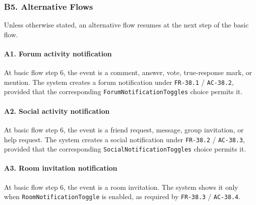 \documentclass[12pt]{article}
\begin{document}
\hypertarget{sec:b5-alternative-flows}{}
\subsubsection*{B5. Alternative Flows}
\par\medskip

Unless otherwise stated, an alternative flow resumes at the next step of the basic flow.
\par\medskip

\hypertarget{sec:a1-forum-activity-notification}{}
\paragraph*{A1. Forum activity notification}
\par\medskip

At basic flow step 6, the event is a comment, answer, vote, true-response mark, or mention. The system creates a forum notification under \texttt{FR-38.1} / \texttt{AC-38.2}, provided that the corresponding \texttt{ForumNotificationToggles} choice permits it.
\par\medskip

\hypertarget{sec:a2-social-activity-notification}{}
\paragraph*{A2. Social activity notification}
\par\medskip

At basic flow step 6, the event is a friend request, message, group invitation, or help request. The system creates a social notification under \texttt{FR-38.2} / \texttt{AC-38.3}, provided that the corresponding \texttt{SocialNotificationToggles} choice permits it.
\par\medskip

\hypertarget{sec:a3-room-invitation-notification}{}
\paragraph*{A3. Room invitation notification}
\par\medskip

At basic flow step 6, the event is a room invitation. The system shows it only when \texttt{RoomNotificationToggle} is enabled, as required by \texttt{FR-38.3} / \texttt{AC-38.4}.
\par\medskip
\end{document}
